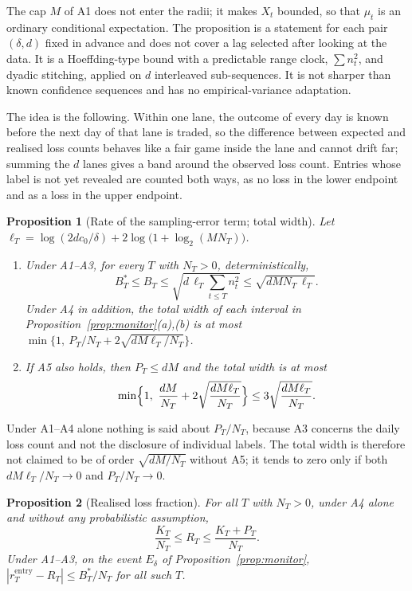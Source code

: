 \documentclass[11pt]{article}
\newtheorem{proposition}{Proposition}
\theoremstyle{remark}
\newcommand{\rentry}{r_T^{\mathrm{entry}}}
\begin{document}
The cap $M$ of A1 does not enter the radii; it makes $X_t$ bounded, so that $\mu_t$ is an
ordinary conditional expectation. The proposition is a statement for each pair $(\delta,d)$
fixed in advance and does not cover a lag selected after looking at the data. It is a
Hoeffding-type bound with a predictable range clock, $\sum n_t^2$, and dyadic stitching, applied
on $d$ interleaved sub-sequences. It is not sharper than known confidence sequences and has no
empirical-variance adaptation.

The idea is the following. Within one lane, the outcome of every day is known before the next
day of that lane is traded, so the difference between expected and realised loss counts behaves
like a fair game inside the lane and cannot drift far; summing the $d$ lanes gives a band around
the observed loss count. Entries whose label is not yet revealed are counted both ways, as no
loss in the lower endpoint and as a loss in the upper endpoint.

\begin{proposition}[Rate of the sampling-error term; total width]
\label{prop:rate}
Let $\ell_T=\log(2dc_0/\delta)+2\log\bigl(1+\log_2(MN_T)\bigr)$.
\begin{enumerate}
\item[(a)] Under A1--A3, for every $T$ with $N_T>0$, deterministically,
\[
B_T^*\le B_T\le\sqrt{d\,\ell_T\sum_{t\le T}n_t^2}\le\sqrt{dMN_T\,\ell_T}.
\]
Under A4 in addition, the total width of each interval in
Proposition~\ref{prop:monitor}(a),(b) is at most
$\min\bigl\{1,\ P_T/N_T+2\sqrt{dM\ell_T/N_T}\bigr\}$.
\item[(b)] If A5 also holds, then $P_T\le dM$ and the total width is at most
\[
\min\Bigl\{1,\ \frac{dM}{N_T}+2\sqrt{\frac{dM\ell_T}{N_T}}\Bigr\}\le3\sqrt{\frac{dM\ell_T}{N_T}}.
\]
\end{enumerate}
\end{proposition}

Under A1--A4 alone nothing is said about $P_T/N_T$, because A3 concerns the daily loss count and
not the disclosure of individual labels. The total width is therefore not claimed to be of order
$\sqrt{dM/N_T}$ without A5; it tends to zero only if both $dM\ell_T/N_T\to0$ and
$P_T/N_T\to0$.

\begin{proposition}[Realised loss fraction]
\label{prop:realised}
For all $T$ with $N_T>0$, under A4 alone and without any probabilistic assumption,
\[
\frac{K_T}{N_T}\le R_T\le\frac{K_T+P_T}{N_T}.
\]
Under A1--A3, on the event $E_\delta$ of Proposition~\ref{prop:monitor},
$|\rentry-R_T|\le B_T^*/N_T$ for all such $T$.
\end{proposition}
\end{document}
